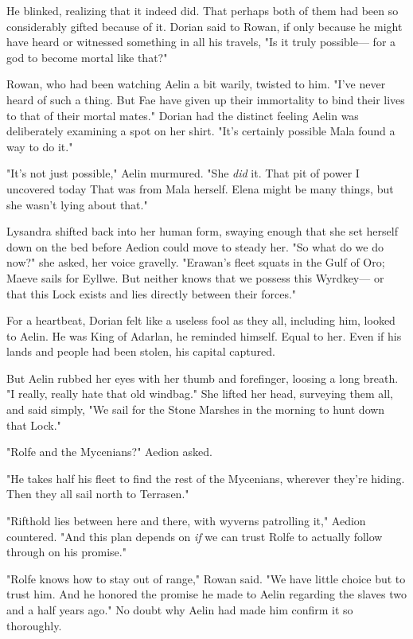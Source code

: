He blinked, realizing that it indeed did. That perhaps both of them had been so considerably gifted because of it. Dorian said to Rowan, if only because he might have heard or witnessed something in all his travels, "Is it truly possible--- for a god to become mortal like that?"

Rowan, who had been watching Aelin a bit warily, twisted to him. "I've never heard of such a thing. But  Fae have given up their immortality to bind their lives to that of their mortal mates." Dorian had the distinct feeling Aelin was deliberately examining a spot on her shirt. "It's certainly possible Mala found a way to do it."

"It's not just possible," Aelin murmured. "She \emph{did} it. That
 pit of power I uncovered today  That was from Mala herself. Elena might be many things, but she wasn't lying about that."

Lysandra shifted back into her human form, swaying enough that she set herself down on the bed before Aedion could move to steady her. "So what do we do now?" she asked, her voice gravelly. "Erawan's fleet squats in the Gulf of Oro; Maeve sails for Eyllwe. But neither knows that we possess this Wyrdkey--- or that this Lock exists  and lies directly between their forces."

For a heartbeat, Dorian felt like a useless fool as they all, including him, looked to Aelin. He was King of Adarlan, he reminded himself. Equal to her. Even if his lands and people had been stolen, his capital captured.

But Aelin rubbed her eyes with her thumb and forefinger, loosing a long breath. "I really, really hate that old windbag." She lifted her head, surveying them all, and said simply, "We sail for the Stone Marshes in the morning to hunt down that Lock."

"Rolfe and the Mycenians?" Aedion asked.

"He takes half his fleet to find the rest of the Mycenians, wherever they're hiding. Then they all sail north to Terrasen."

"Rifthold lies between here and there, with wyverns patrolling it," Aedion countered. "And this plan depends on \emph{if} we can trust Rolfe to actually follow through on his promise."

"Rolfe knows how to stay out of range," Rowan said. "We have little choice but to trust him. And he honored the promise he made to Aelin regarding the slaves two and a half years ago." No doubt why Aelin had made him confirm it so thoroughly.

